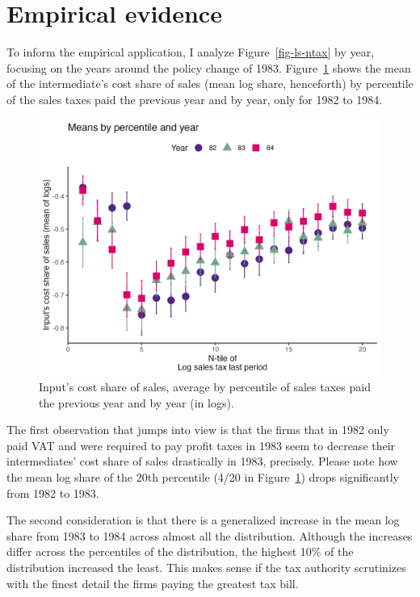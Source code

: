 \documentclass[
  12pt]{article}
\theoremstyle{definition}
\theoremstyle{remark}
\begin{document}
\hypertarget{empirical-evidence}{%
\section{Empirical evidence}\label{empirical-evidence}}

To inform the empirical application, I analyze Figure~\ref{fig-ls-ntax}
by year, focusing on the years around the policy change of 1983.
Figure~\ref{fig-ls-83} shows the mean of the intermediate's cost share
of sales (mean log share, henceforth) by percentile of the sales taxes
paid the previous year and by year, only for 1982 to 1984.

\begin{figure}

{\centering \includegraphics[width=1\textwidth,height=\textheight]{../Results/Figures/Colombia/night_disc_byy_lag_log_sales_tax_82-83-84_20.png}

}

\caption{\label{fig-ls-83}Input's cost share of sales, average by
percentile of sales taxes paid the previous year and by year (in logs).}

\end{figure}

The first observation that jumps into view is that the firms that in
1982 only paid VAT and were required to pay profit taxes in 1983 seem to
decrease their intermediates' cost share of sales drastically in 1983,
precisely. Please note how the mean log share of the 20th percentile
(4/20 in Figure~\ref{fig-ls-83}) drops significantly from 1982 to 1983.

The second consideration is that there is a generalized increase in the
mean log share from 1983 to 1984 across almost all the distribution.
Although the increases differ across the percentiles of the
distribution, the highest 10\% of the distribution increased the least.
This makes sense if the tax authority scrutinizes with the finest detail
the firms paying the greatest tax bill.
\end{document}
